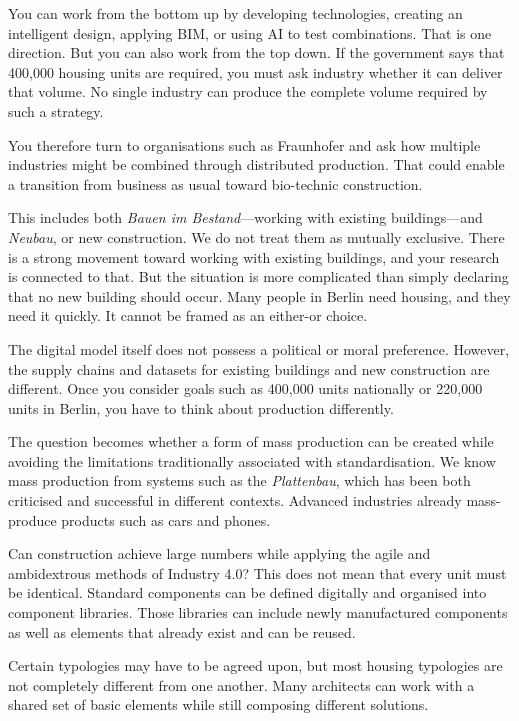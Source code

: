 You can work from the bottom up by developing technologies, creating an intelligent design, applying BIM, or using AI to test combinations. That is one direction. But you can also work from the top down. If the government says that 400,000 housing units are required, you must ask industry whether it can deliver that volume. No single industry can produce the complete volume required by such a strategy.

You therefore turn to organisations such as Fraunhofer and ask how multiple industries might be combined through distributed production. That could enable a transition from business as usual toward bio-technic construction.

This includes both \textit{Bauen im Bestand}—working with existing buildings—and \textit{Neubau}, or new construction. We do not treat them as mutually exclusive. There is a strong movement toward working with existing buildings, and your research is connected to that. But the situation is more complicated than simply declaring that no new building should occur. Many people in Berlin need housing, and they need it quickly. It cannot be framed as an either-or choice.

The digital model itself does not possess a political or moral preference. However, the supply chains and datasets for existing buildings and new construction are different. Once you consider goals such as 400,000 units nationally or 220,000 units in Berlin, you have to think about production differently.

The question becomes whether a form of mass production can be created while avoiding the limitations traditionally associated with standardisation. We know mass production from systems such as the \textit{Plattenbau}, which has been both criticised and successful in different contexts. Advanced industries already mass-produce products such as cars and phones.

Can construction achieve large numbers while applying the agile and ambidextrous methods of Industry 4.0? This does not mean that every unit must be identical. Standard components can be defined digitally and organised into component libraries. Those libraries can include newly manufactured components as well as elements that already exist and can be reused.

Certain typologies may have to be agreed upon, but most housing typologies are not completely different from one another. Many architects can work with a shared set of basic elements while still composing different solutions.


